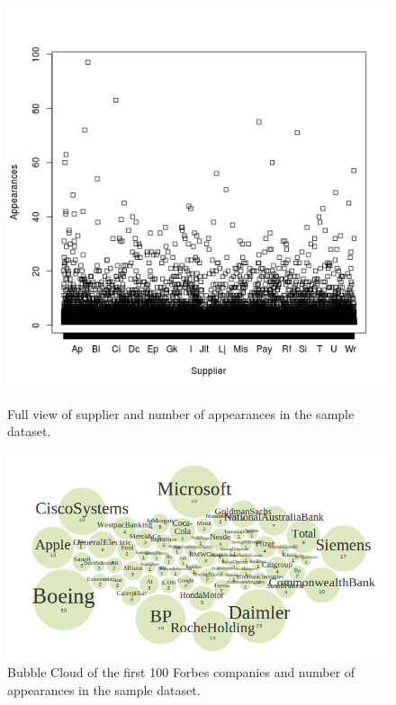 \documentclass{llncs}
\begin{document}
\begin{figure}[ht]
\begin{minipage}[b]{0.45\linewidth}
\centering
	\includegraphics[width=\textwidth]{./imgs/corfu-stats}
 \caption{Full view of supplier and number of appearances in the sample dataset.}
 \label{fig:results-graph-3}
\end{minipage}
\hspace{0.5cm}
\begin{minipage}[b]{0.45\linewidth}
\centering
  \includegraphics[width=\textwidth]{./imgs/forbes}
 \caption{Bubble Cloud of the first 100 Forbes companies and number of appearances in the sample dataset. }
 \label{fig:results-graph-4}
\end{minipage}
\end{figure}
\end{document}

